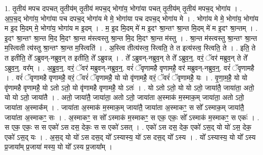 \documentclass[17pt]{extarticle}
\begin{document}
1. तृ॒तीय॑ मपच दपचत् तृ॒तीय॑म् तृ॒तीय॑ मपच॒द् भोगा॑य॒ भोगा॑या पचत् तृ॒तीय॑म् तृ॒तीय॑ मपच॒द् भोगा॑य । . अ॒प॒च॒द् भोगा॑य॒ भोगा॑या पच दपच॒द् भोगा॑य मे मे॒ भोगा॑या पच दपच॒द् भोगा॑य मे । . भोगा॑य मे मे॒ भोगा॑य॒ भोगा॑य म इ॒द मि॒दम् मे॒ भोगा॑य॒ भोगा॑य म इ॒दम् । . म॒ इ॒द मि॒दम् मे॑ म इ॒दꣳ श्रा॒न्तꣳ श्रा॒न्त मि॒दम् मे॑ म इ॒दꣳ श्रा॒न्तम् । . इ॒दꣳ श्रा॒न्तꣳ श्रा॒न्त मि॒द मि॒दꣳ श्रा॒न्त म॑स्त्वस्तु श्रा॒न्त मि॒द मि॒दꣳ श्रा॒न्त म॑स्तु । . श्रा॒न्त म॑स्त्वस्तु श्रा॒न्तꣳ श्रा॒न्त म॒स्त्विती त्य॑स्तु श्रा॒न्तꣳ श्रा॒न्त म॒स्त्विति॑ । . अ॒स्त्वि तीत्य॑स्त्व॒ स्त्विति॒ ते त इत्य॑स्त्व॒ स्त्विति॒ ते । . इति॒ ते त इतीति॒ ते᳚ ऽब्रुवन्-नब्रुव॒न् त इतीति॒ ते᳚ ऽब्रुवन्न् । . ते᳚ ऽब्रुवन्-नब्रुव॒न् ते ते᳚ ऽब्रुव॒न्॒. वरं॒ ॅवर॑ मब्रुव॒न् ते ते᳚ ऽब्रुव॒न्॒. वर᳚म् । . अ॒ब्रु॒व॒न्॒. वरं॒ ॅवर॑ मब्रुवन्-नब्रुव॒न्॒. वरं॑ ॅवृणामहै वृणामहै॒ वर॑ मब्रुवन्-नब्रुव॒न्॒. वरं॑ ॅवृणामहै । . वरं॑ ॅवृणामहै वृणामहै॒ वरं॒ ॅवरं॑ ॅवृणामहै॒ यो यो वृ॑णामहै॒ वरं॒ ॅवरं॑ ॅवृणामहै॒ यः । . वृ॒णा॒म॒है॒ यो यो वृ॑णामहै वृणामहै॒ यो ऽतो ऽतो॒ यो वृ॑णामहै वृणामहै॒ यो ऽतः॑ । . यो ऽतो ऽतो॒ यो यो ऽतो॒ जाया॑तै॒ जाया॑ता॒ अतो॒ यो यो ऽतो॒ जाया॑तै । . अतो॒ जाया॑तै॒ जाया॑ता॒ अतो ऽतो॒ जाया॑ता अ॒स्माक॑ म॒स्माक॒म् जाया॑ता॒ अतो ऽतो॒ जाया॑ता अ॒स्माक᳚म् । . जाया॑ता अ॒स्माक॑ म॒स्माक॒म् जाया॑तै॒ जाया॑ता अ॒स्माकꣳ॒॒ स सो᳚ ऽस्माक॒म् जाया॑तै॒ जाया॑ता अ॒स्माकꣳ॒॒ सः । . अ॒स्माकꣳ॒॒ स सो᳚ ऽस्माक॑ म॒स्माकꣳ॒॒ स एक॒ एकः॒ सो᳚ ऽस्माक॑ म॒स्माकꣳ॒॒ स एकः॑ । . स एक॒ एकः॒ स स एको॑ ऽस दस॒ देकः॒ स स एको॑ ऽसत् । . एको॑ ऽस दस॒ देक॒ एको॑ ऽस॒द् यो यो॑ ऽस॒ देक॒ एको॑ ऽस॒द् यः । . अ॒स॒द् यो यो॑ ऽस दस॒द् यो᳚ ऽस्यास्य॒ यो॑ ऽस दस॒द् यो᳚ ऽस्य । . यो᳚ ऽस्यास्य॒ यो यो᳚ ऽस्य प्र॒जाया᳚म् प्र॒जाया॑ मस्य॒ यो यो᳚ ऽस्य प्र॒जाया᳚म् । \newline
\end{document}
